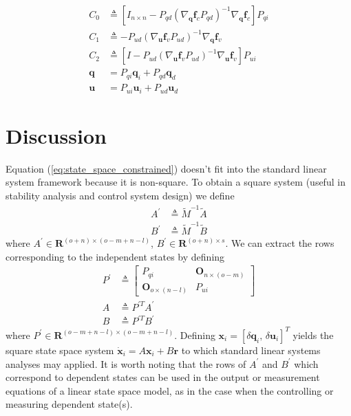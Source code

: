 \documentclass[smallcondensed]{svjour3}                     %
\begin{document}
\begin{align}
  \label{eq:C_0}
  C_0 &\triangleq \left[ I_{n \times n} - P_{qd}(\nabla_{\bm{q}}
    \bm{f}_{c} P_{qd})^{-1} \nabla_{\bm{q}} \bm{f}_{c} \right] P_{qi}\\
  \label{eq:C_1}
  C_1 &\triangleq -P_{ud}(\nabla_{\bm{u}} \bm{f}_{v} P_{ud})^{-1}
  \nabla_{\bm{q}} \bm{f}_{v} \\
  \label{eq:C_2}
  C_2 &\triangleq \left[I - P_{ud} (\nabla_{\bm{u}}\bm{f}_{v} P_{ud})^{-1} \nabla_{\bm{u}}
    \bm{f}_{v} \right] P_{ui}\\
  \label{eq:Pq}
  \bm{q} &= P_{qi} \bm{q}_{i} + P_{qd} \bm{q}_{d} \\
  \label{eq:Pu}
  \bm{u} &= P_{ui} \bm{u}_{i} + P_{ud} \bm{u}_{d}
\end{align}

\section{Discussion}
\label{sec:discussion}
Equation (\ref{eq:state_space_constrained}) doesn't fit into the standard linear
system framework because it is non-square.  To obtain a square system (useful
in stability analysis and control system design) we define
\begin{align}
  \label{eq:A_prime}
    A^\prime &\triangleq \tilde{M}^{-1} \tilde{A} \\
  \label{eq:B_prime}
    B^\prime &\triangleq \tilde{M}^{-1} \tilde{B}
\end{align}
where  $A^\prime \in \bm{R}^{(o + n) \times (o - m + n -l)}$, $B^\prime \in
\bm{R}^{(o + n) \times s}$.  We can extract the rows corresponding to the
independent states by defining
\begin{align}
  \label{eq:P_prime}
    P^\prime &\triangleq \begin{bmatrix}
        P_{qi} & \bm{O}_{n \times (o - m)} \\
        \bm{O}_{o \times (n - l)} & P_{ui}
    \end{bmatrix} \\
  \label{eq:A}
    A &\triangleq P^{\prime T} A^\prime \\
  \label{eq:B}
    B &\triangleq P^{\prime T} B^\prime
\end{align}
where $P^\prime \in \bm{R}^{(o - m + n - l) \times (o - m + n - l)}$.  Defining
$\bm{x}_i = \left[\delta\bm{q}_i,\,\delta\bm{u}_i\right]^{T}$ yields the square
state space system $\dot{\bm{x}}_i = A \bm{x}_i + B \bm{r}$ to which standard
linear systems analyses may applied.  It is worth noting that the rows
of $A^\prime$ and $B^\prime$ which correspond to dependent states can be used
in the output or measurement equations of a linear state space model, as in the
case when the controlling or measuring dependent state(s).
\end{document}
